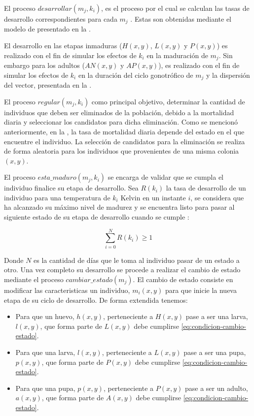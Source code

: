 El proceso $desarrollar(m_{j}, k_{i})$, es el proceso por el cual se calculan las tasas de
desarrollo correspondientes para cada $m_{j}$ . Estas son obtenidas mediante el modelo de
\cite{sharpe1977reaction} presentado en la .

El desarrollo en las etapas inmaduras ($H(x,y)$, $L(x,y)$ y $P(x,y)$) es realizado con el fin de
simular los efectos de $k_{i}$ en la maduración de $m_{j}$. Sin embargo para los adultos ($AN(x,y)$
y $AP(x,y)$), es realizado con el fin de simular los efectos de $k_{i}$ en la duración del ciclo
gonotrófico de $m_{j}$ y la dispersión del vector, presentada en la
.

El proceso $regular(m_{j}, k_{i})$ como principal objetivo, determinar la cantidad de individuos
que deben ser eliminados de la población, debido a la mortalidad diaria y seleccionar los
candidatos para dicha eliminación. Como se mencionó anteriormente, en la
, la tasa de mortalidad diaria depende del estado en el que
encuentre el individuo. La selección de candidatos para la eliminación se realiza de forma
aleatoria para los individuos que provenientes de una misma colonia $(x, y)$.

El proceso $esta\_maduro(m_{j}, k_{i})$ se encarga de validar que se cumpla el individuo finalice
su etapa de desarrollo. Sea $R(k_{i})$ la tasa de desarrollo de un individuo para una temperatura
de $k_{i}$ Kelvin en un instante $i$, se considera que ha alcanzado su máximo nivel de madurez y
se encuentra listo para pasar al siguiente estado de su etapa de desarrollo cuando se cumple :

\begin{equation}
\label{eq:condicion-cambio-estado}
    \sum_{i=0}^{N} R(k_{i}) \geq 1
\end{equation}

Donde $N$ es la cantidad de días que le toma al individuo pasar de un estado a otro. Una vez
completo su desarrollo se procede a realizar el cambio de estado mediante el proceso
$cambiar\_estado(m_{j})$. El cambio de estado consiste en modificar las caracteristicas un
individuo, $m_{i}(x,y)$ para que inicie la nueva etapa de su ciclo de desarrollo. De forma
extendida tenemos:

\begin{itemize}
\item Para que un huevo, $h(x,y)$, perteneciente a $H(x,y)$ pase a ser una larva, $l(x,y)$, que forma parte de $L(x,y)$ debe cumplirse \eqref{eq:condicion-cambio-estado}.

\item Para que una larva, $l(x,y)$, perteneciente a $L(x,y)$ pase a ser una pupa, $p(x,y)$, que forma parte de $P(x,y)$ debe cumplirse \eqref{eq:condicion-cambio-estado}.

\item Para que una pupa, $p(x,y)$, perteneciente a $P(x,y)$ pase a ser un adulto, $a(x,y)$, que forma parte de $A(x,y)$ debe cumplirse \eqref{eq:condicion-cambio-estado}.
\end{itemize}


